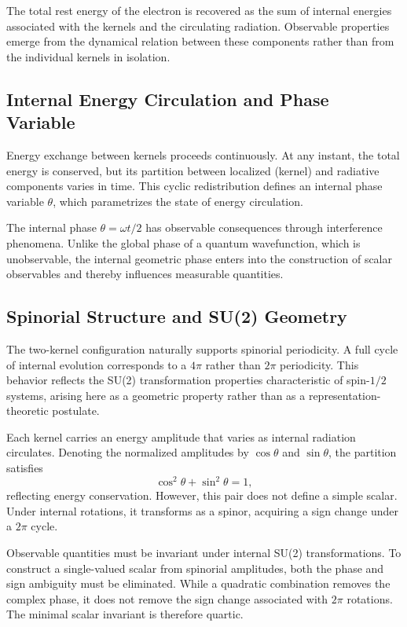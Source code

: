 \documentclass[%
 reprint,
 amsmath,amssymb,
 aps,
 prb,
]{revtex4-2}
\numberwithin{equation}{section}
\begin{document}
The total rest energy of the electron is recovered as the sum of internal energies associated with the kernels and the circulating radiation. Observable properties emerge from the dynamical relation between these components rather than from the individual kernels in isolation.


\subsection{Internal Energy Circulation and Phase Variable}
\label{subsec:energy_circulation}

Energy exchange between kernels proceeds continuously. At any instant, the total energy is conserved, but its partition between localized (kernel) and radiative components varies in time. This cyclic redistribution defines an internal phase variable $\theta$, which parametrizes the state of energy circulation.

The internal phase $\theta = \omega t/2$ has observable consequences through interference phenomena. Unlike the global phase of a quantum wavefunction, which is unobservable, the internal geometric phase enters into the construction of scalar observables and thereby influences measurable quantities.


\subsection{Spinorial Structure and SU(2) Geometry}
\label{subsec:su2_geometry}

The two-kernel configuration naturally supports spinorial periodicity. A full cycle of internal evolution corresponds to a $4\pi$ rather than $2\pi$ periodicity. This behavior reflects the SU(2) transformation properties characteristic of spin-$1/2$ systems, arising here as a geometric property rather than as a representation-theoretic postulate.

Each kernel carries an energy amplitude that varies as internal radiation circulates. Denoting the normalized amplitudes by $\cos\theta$ and $\sin\theta$, the partition satisfies
\begin{equation}
\cos^2\theta + \sin^2\theta = 1,
\label{eq:amplitude_partition}
\end{equation}
reflecting energy conservation. However, this pair does not define a simple scalar. Under internal rotations, it transforms as a spinor, acquiring a sign change under a $2\pi$ cycle.

Observable quantities must be invariant under internal SU(2) transformations. To construct a single-valued scalar from spinorial amplitudes, both the phase and sign ambiguity must be eliminated. While a quadratic combination removes the complex phase, it does not remove the sign change associated with $2\pi$ rotations. The minimal scalar invariant is therefore quartic.
\end{document}
